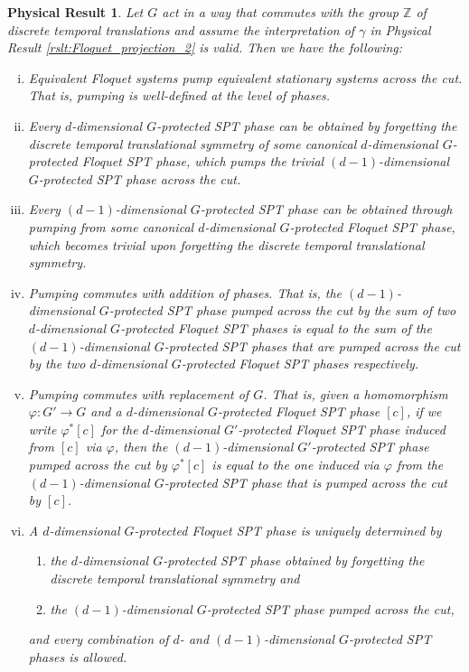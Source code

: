 \documentclass[sort&compress]{elsarticle}
\theoremstyle{theoremstyle}
\theoremstyle{framedtheoremstyle}
\newtheorem{rslt}{Physical Result}
\theoremstyle{definitionstyle}
\theoremstyle{definitionstyle}
\theoremstyle{definitionstyle}
\theoremstyle{definitionstyle}
\theoremstyle{nameddefinitionstyle}
\theoremstyle{framednameddefinitionstyle}
\theoremstyle{proofstyle}
\theoremstyle{definitionstyle}
\newcommand{\fromto}{\rightarrow}
\newcommand{\ZZZ}{\mathbb{Z}}
\newcommand{\brackets}[1]{\left[ #1 \right]}
\begin{document}
\begin{framed}\begin{rslt}
Let $G$ act in a way that commutes with the group $\ZZZ$ of discrete temporal translations and assume the interpretation of $\gamma$ in Physical Result \ref{rslt:Floquet_projection_2} is valid. Then we have the following:
\begin{enumerate}[(i)]
\item Equivalent Floquet systems pump equivalent stationary systems across the cut. That is, pumping is well-defined at the level of phases.

\item Every $d$-dimensional $G$-protected SPT phase can be obtained by forgetting the discrete temporal translational symmetry of some canonical $d$-dimensional $G$-protected Floquet SPT phase, which pumps the trivial $(d-1)$-dimensional $G$-protected SPT phase across the cut.

\item Every $(d-1)$-dimensional $G$-protected SPT phase can be obtained through pumping from some canonical $d$-dimensional $G$-protected Floquet SPT phase, which becomes trivial upon forgetting the discrete temporal translational symmetry.

\item Pumping commutes with addition of phases. That is, the $(d-1)$-dimensional $G$-protected SPT phase pumped across the cut by the sum of two $d$-dimensional $G$-protected Floquet SPT phases is equal to the sum of the $(d-1)$-dimensional $G$-protected SPT phases that are pumped across the cut by the two $d$-dimensional $G$-protected Floquet SPT phases respectively.

\item Pumping commutes with replacement of $G$. That is, given a homomorphism $\varphi: G' \fromto G$ and a $d$-dimensional $G$-protected Floquet SPT phase $\brackets{c}$, if we write $\varphi^* \brackets{c}$ for the $d$-dimensional $G'$-protected Floquet SPT phase induced from $\brackets{c}$ via $\varphi$, then the $(d-1)$-dimensional $G'$-protected SPT phase pumped across the cut by $\varphi^* \brackets{c}$ is equal to the one induced via $\varphi$ from the $(d-1)$-dimensional $G$-protected SPT phase that is pumped across the cut by $\brackets{c}$.

\item A $d$-dimensional $G$-protected Floquet SPT phase is uniquely determined by
\begin{enumerate}
\item the $d$-dimensional $G$-protected SPT phase obtained by forgetting the discrete temporal translational symmetry and

\item the $(d-1)$-dimensional $G$-protected SPT phase pumped across the cut,
\end{enumerate}
and every combination of $d$- and $(d-1)$-dimensional $G$-protected SPT phases is allowed.
\end{enumerate}
\end{rslt}\end{framed}
\end{document}
